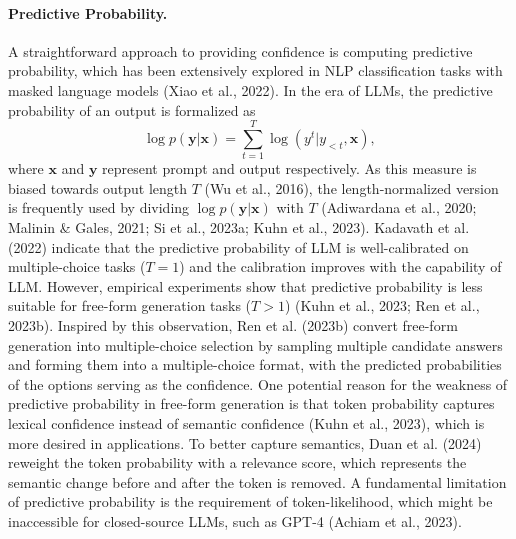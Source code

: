 \paragraph{Predictive Probability.} A straightforward approach to providing confidence is computing predictive probability, which has been extensively explored in NLP classification tasks with masked language models (Xiao et al., 2022). In the era of LLMs, the predictive probability of an output is formalized as
\begin{equation}
\log p(\bm{y}|\bm{x}) = \sum_{t=1}^{T} \log(y^t | y_{<t}, \bm{x}),
\end{equation}
where $\bm{x}$ and $\bm{y}$ represent prompt and output respectively. As this measure is biased towards output length $T$ (Wu et al., 2016), the length-normalized version is frequently used by dividing $\log p(\bm{y}|\bm{x})$ with $T$ (Adiwardana et al., 2020; Malinin \& Gales, 2021; Si et al., 2023a; Kuhn et al., 2023). Kadavath et al. (2022) indicate that the predictive probability of LLM is well-calibrated on multiple-choice tasks ($T = 1$) and the calibration improves with the capability of LLM. However, empirical experiments show that predictive probability is less suitable for free-form generation tasks ($T > 1$) (Kuhn et al., 2023; Ren et al., 2023b). Inspired by this observation, Ren et al. (2023b) convert free-form generation into multiple-choice selection by sampling multiple candidate answers and forming them into a multiple-choice format, with the predicted probabilities of the options serving as the confidence. One potential reason for the weakness of predictive probability in free-form generation is that token probability captures lexical confidence instead of semantic confidence (Kuhn et al., 2023), which is more desired in applications. To better capture semantics, Duan et al. (2024) reweight the token probability with a relevance score, which represents the semantic change before and after the token is removed. A fundamental limitation of predictive probability is the requirement of token-likelihood, which might be inaccessible for closed-source LLMs, such as GPT-4 (Achiam et al., 2023).

